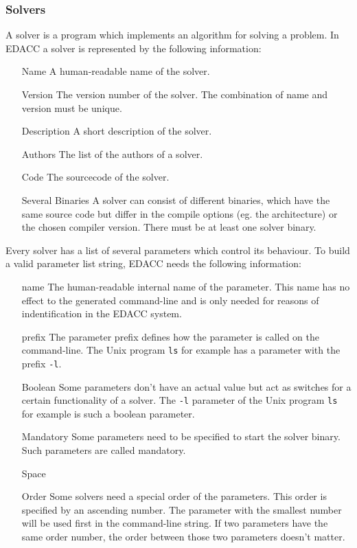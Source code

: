 \subsubsection{Solvers}

 A solver is a program which implements an algorithm for solving a problem. In EDACC a solver is represented by the following information:
\begin{enumerate}
 \item[Name] A human-readable name of the solver.
 \item[Version] The version number of the solver. The combination of name and version must be unique.
 \item[Description] A short description of the solver.
 \item[Authors] The list of the authors of a solver.
 \item[Code] The sourcecode of the solver.
 \item[Several Binaries] A solver can consist of different binaries, which have the same source code but differ in the compile options (eg. the architecture) or the chosen compiler version. There must be at least one solver binary.
\end{enumerate}

 Every solver has a list of several parameters which control its behaviour. To build a valid parameter list string, EDACC needs the following information:
\begin{enumerate}
 \item[name] The human-readable internal name of the parameter. This name has no effect to the generated command-line and is only needed for reasons of indentification in the EDACC system.
 \item[prefix] The parameter prefix defines how the parameter is called on the command-line. The Unix program \verb|ls| for example has a parameter with the prefix \verb|-l|.
 \item[Boolean] Some parameters don't have an actual value but act as switches for a certain functionality of a solver. The \verb|-l| parameter of the Unix program \verb|ls| for example is such a boolean parameter.
 \item[Mandatory] Some parameters need to be specified to start the solver binary. Such parameters are called mandatory.
 \item[Space]
 \item[Order] Some solvers need a special order of the parameters. This order is specified by an ascending number. The parameter with the smallest number will be used first in the command-line string. If two parameters have the same order number, the order between those two parameters doesn't matter.
\end{enumerate}

